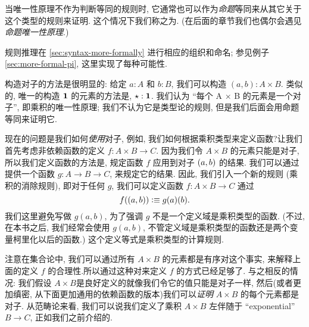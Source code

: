 \begin{rmk}
\begin{enumerate}
当唯一性原理不作为判断等同的规则时, 它通常也可以作为\emph{命题}等同来从其它关于这个类型的规则来证明.
这个情况下我们称之为.
%
%
(在后面的章节我们也偶尔会遇见\emph{命题唯一性原理}.)
%
\end{enumerate}
规则推理在 \cref{sec:syntax-more-formally} 进行相应的组织和命名; 参见例子 \cref{sec:more-formal-pi}, 这里实现了每种可能性. \end{rmk}

构造对子的方法是很明显的: 给定 $a:A$ 和 $b:B$, 我们可以构造 $(a,b):A\times B$. 类似的, 唯一的构造 $\mathbf{1}$ 的元素的方法是, $\star:\mathbf{1}$. 我们认为 ``每个 A × B 的元素是一个对子'', 即乘积的唯一性原理; 我们不认为它是类型论的规则, 但是我们后面会用命题等同来证明它. 

现在的问题是我们如何\emph{使用}对子, 例如, 我们如何根据乘积类型来定义函数?让我们首先考虑非依赖函数的定义 $f : A\times B \to C$. 因为我们令 $A\times B$ 的元素只能是对子, 所以我们定义函数的方法是, 规定函数 $f$ 应用到对子 $(a,b)$ 的结果. 我们可以通过提供一个函数 $g : A \to B \to C$, 来规定它的结果. 因此, 我们引入一个新的规则 (乘积的消除规则), 即对于任何 $g$, 我们可以定义函数 $f : A\times B \to C$ 通过\ \[ f((a,b)) \vcentcolon\equiv g(a)(b). \]
我们这里避免写做 $g(a,b)$, 为了强调 $g$ 不是一个定义域是乘积类型的函数. (不过, 在本书之后, 我们经常会使用 $g(a,b)$, 不管定义域是乘积类型的函数还是两个变量柯里化以后的函数.) 这个定义等式是乘积类型的计算规则. 

注意在集合论中, 我们可以通过所有 $A\times B$ 的元素都是有序对这个事实, 来解释上面的定义 $f$ 的合理性.所以通过这种对来定义 $f$ 的方式已经足够了. 与之相反的情况: 我们假设 $A\times B$是良好定义的就像我们令它的值只能是对子一样, 然后(或者更加缜密, 从下面更加通用的依赖函数的版本)我们可以\emph{证明} $A\times B$ 的每个元素都是对子. 从范畴论来看, 我们可以说我们定义了乘积 $A\times B$ 左伴随于 ``exponential'' $B\to C$, 正如我们之前介绍的. 


